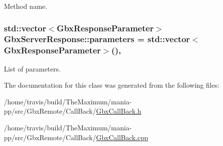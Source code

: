 Method name. 

\hypertarget{classGbxServerResponse_acfd80e7b92cf34e1f0cda88a11a1bed0}{
\subsubsection[{parameters}]{\setlength{\rightskip}{0pt plus 5cm}std\-::vector$<${\bf Gbx\-Response\-Parameter}$>$ Gbx\-Server\-Response\-::parameters = std\-::vector$<${\bf Gbx\-Response\-Parameter}$>$()\hspace{0.3cm}{\ttfamily [protected]}, {\ttfamily [inherited]}}}\label{classGbxServerResponse_acfd80e7b92cf34e1f0cda88a11a1bed0}


List of parameters. 



The documentation for this class was generated from the following files\-:\begin{DoxyCompactItemize}
\item 
/home/travis/build/\-The\-Maximum/mania-\/pp/src/\-Gbx\-Remote/\-Call\-Back/\hyperlink{GbxCallBack_8h}{Gbx\-Call\-Back.\-h}\item 
/home/travis/build/\-The\-Maximum/mania-\/pp/src/\-Gbx\-Remote/\-Call\-Back/\hyperlink{GbxCallBack_8cpp}{Gbx\-Call\-Back.\-cpp}\end{DoxyCompactItemize}
